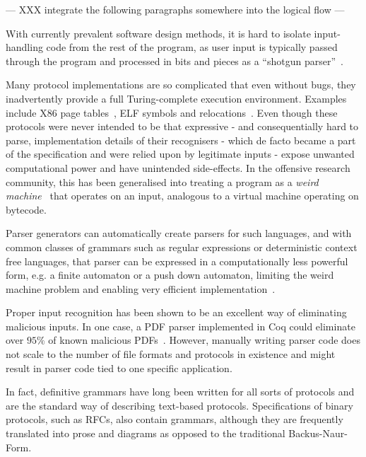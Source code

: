 --- XXX integrate the following paragraphs somewhere into the logical flow ---

With currently prevalent software design methods, it is hard to isolate
input-handling code from the rest of the program, as user input is
typically passed through the program and processed in bits and pieces as a
``shotgun parser''~\cite{shotgun-parser}.

Many protocol implementations are so complicated that even
without bugs, they inadvertently provide a full Turing-complete execution
environment. Examples include X86 page tables~\cite{bangert2013page},
ELF symbols and relocations~\cite{shapiro2013weird}. Even though
these protocols were never intended to be that expressive -
and consequentially hard to parse, implementation details of their
recognisers - which de facto became a part of the specification and were
relied upon by legitimate inputs - expose unwanted computational power
and have unintended side-effects.  In the offensive research community,
this has been generalised into treating a program as a \textit{weird
machine}~\cite{bratus2011exploit} that operates on an input, analogous
to a virtual machine operating on bytecode.

Parser generators can automatically create parsers for such languages,
and with common classes of grammars such as regular expressions or
deterministic context free languages, that parser can be expressed in a
computationally less powerful form, e.g. a finite automaton or a push
down automaton, limiting the weird machine problem and enabling very
efficient implementation~\cite{Knuth1965607}.

Proper input recognition has been shown to be an excellent way of
eliminating malicious inputs. In one case, a  PDF parser implemented in
Coq could eliminate over $95\%$ of known malicious PDFs~\cite{Bogk-PDF}.
However, manually writing parser code does not scale to the number of
file formats  and protocols in existence and might result in parser code
tied to one specific application.

In fact, definitive grammars have long been written for all sorts of
protocols and are the standard way of describing text-based protocols.
Specifications of binary protocols, such as RFCs, also contain grammars,
although they are frequently translated into prose and diagrams as
opposed to the traditional Backus-Naur-Form.

